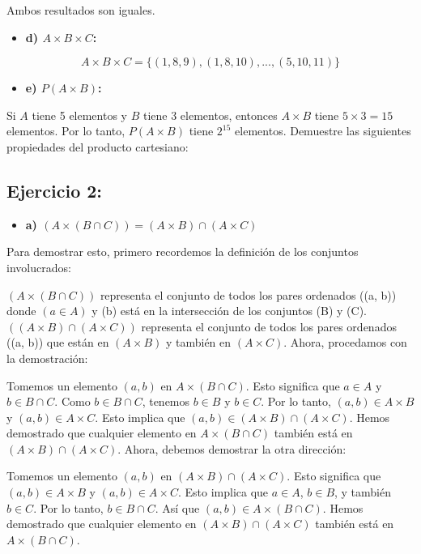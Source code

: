 \documentclass{templateNote}
\begin{document}
Ambos resultados son iguales.

\begin{itemize}
    \item \textbf{d) \(A \times B \times C\):}
\end{itemize}

\[ A \times B \times C = \{(1, 8, 9), (1, 8, 10), ..., (5, 10, 11)\} \]

\begin{itemize}
    \item \textbf{e) \(P(A \times B)\):}
\end{itemize}

Si \(A\) tiene 5 elementos y \(B\) tiene 3 elementos, entonces \(A \times B\) tiene \(5 \times 3 = 15\) elementos. Por lo tanto, \(P(A \times B)\) tiene \(2^{15}\) elementos.
Demuestre las siguientes propiedades del producto cartesiano:

\subsection*{\textbf{Ejercicio 2}:} 
\begin{itemize}
    \item \textbf{a) $(A \times (B \cap C)) = (A \times B) \cap (A \times C)$}
\end{itemize}

Para demostrar esto, primero recordemos la definición de los conjuntos involucrados:

$(A \times (B \cap C))$ representa el conjunto de todos los pares ordenados ((a, b)) donde $(a \in A)$ y (b) está en la intersección de los conjuntos (B) y (C).
$((A \times B) \cap (A \times C))$ representa el conjunto de todos los pares ordenados ((a, b)) que están en $(A \times B)$ y también en $(A \times C)$.
Ahora, procedamos con la demostración:

Tomemos un elemento $(a, b)$ en $A \times (B \cap C)$. Esto significa que $a \in A$ y $b \in B \cap C$.
Como $b \in B \cap C$, tenemos $b \in B$ y $b \in C$.
Por lo tanto, $(a, b) \in A \times B$ y $(a, b) \in A \times C$.
Esto implica que $(a, b) \in (A \times B) \cap (A \times C)$.
Hemos demostrado que cualquier elemento en $A \times (B \cap C)$ también está en $(A \times B) \cap (A \times C)$. Ahora, debemos demostrar la otra dirección:

Tomemos un elemento $(a, b)$ en $(A \times B) \cap (A \times C)$. Esto significa que $(a, b) \in A \times B$ y $(a, b) \in A \times C$.
Esto implica que $a \in A$, $b \in B$, y también $b \in C$.
Por lo tanto, $b \in B \cap C$.
Así que $(a, b) \in A \times (B \cap C)$.
Hemos demostrado que cualquier elemento en $(A \times B) \cap (A \times C)$ también está en $A \times (B \cap C)$.
\end{document}
